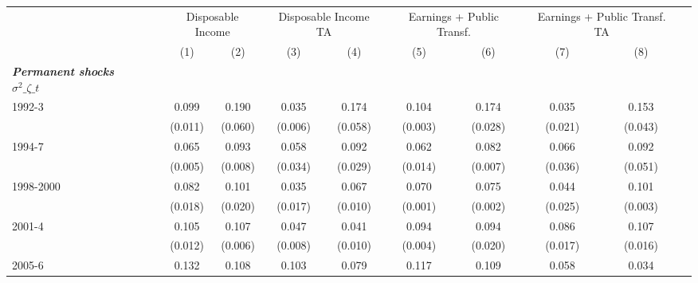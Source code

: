 \begin{tabular}{l*{10}{c}} \toprule
                    &            &\multicolumn{2}{c}{Disposable Income}&\multicolumn{2}{c}{Disposable Income TA}&\multicolumn{2}{c}{Earnings + Public Transf.}&\multicolumn{2}{c}{Earnings + Public Transf. TA}\\\cmidrule{3-4}\cmidrule{5-6}\cmidrule{7-8}\cmidrule{9-10}
                    &            &\multicolumn{1}{c}{(1)}&\multicolumn{1}{c}{(2)}&\multicolumn{1}{c}{(3)}&\multicolumn{1}{c}{(4)}&\multicolumn{1}{c}{(5)}&\multicolumn{1}{c}{(6)}&\multicolumn{1}{c}{(7)}&\multicolumn{1}{c}{(8)}\\
\midrule
\textbf{\emph{Permanent shocks $\sigma^2\_{\zeta\_t}$}}&            &            &            &            &            &            &            &            &            \\
\hspace{.3cm} 1992-3&            &       0.099&       0.190&       0.035&       0.174&       0.104&       0.174&       0.035&       0.153\\
                    &            &     (0.011)&     (0.060)&     (0.006)&     (0.058)&     (0.003)&     (0.028)&     (0.021)&     (0.043)\\
\hspace{.3cm} 1994-7&            &       0.065&       0.093&       0.058&       0.092&       0.062&       0.082&       0.066&       0.092\\
                    &            &     (0.005)&     (0.008)&     (0.034)&     (0.029)&     (0.014)&     (0.007)&     (0.036)&     (0.051)\\
\hspace{.3cm} 1998-2000&            &       0.082&       0.101&       0.035&       0.067&       0.070&       0.075&       0.044&       0.101\\
                    &            &     (0.018)&     (0.020)&     (0.017)&     (0.010)&     (0.001)&     (0.002)&     (0.025)&     (0.003)\\
\hspace{.3cm} 2001-4&            &       0.105&       0.107&       0.047&       0.041&       0.094&       0.094&       0.086&       0.107\\
                    &            &     (0.012)&     (0.006)&     (0.008)&     (0.010)&     (0.004)&     (0.020)&     (0.017)&     (0.016)\\
\hspace{.3cm} 2005-6&            &       0.132&       0.108&       0.103&       0.079&       0.117&       0.109&       0.058&       0.034\\

\end{tabular}
